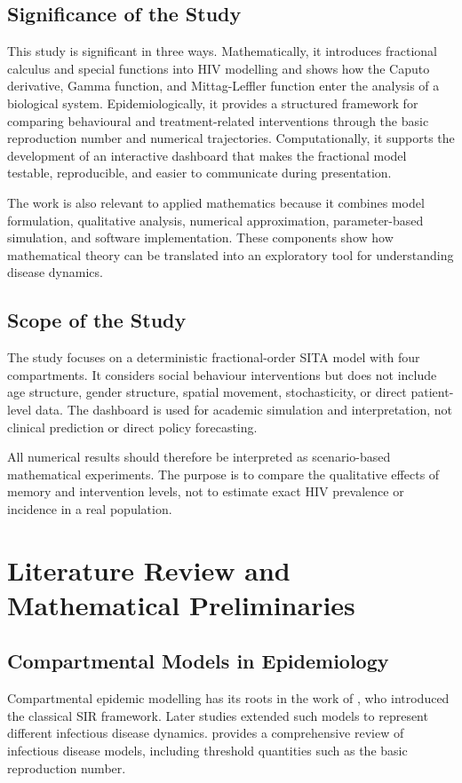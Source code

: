 \documentclass[12pt,a4paper,oneside]{report}
\begin{document}
\newpage

\section{Significance of the Study}
This study is significant in three ways. Mathematically, it introduces fractional calculus and special functions into HIV modelling and shows how the Caputo derivative, Gamma function, and Mittag-Leffler function enter the analysis of a biological system. Epidemiologically, it provides a structured framework for comparing behavioural and treatment-related interventions through the basic reproduction number and numerical trajectories. Computationally, it supports the development of an interactive dashboard that makes the fractional model testable, reproducible, and easier to communicate during presentation.

The work is also relevant to applied mathematics because it combines model formulation, qualitative analysis, numerical approximation, parameter-based simulation, and software implementation. These components show how mathematical theory can be translated into an exploratory tool for understanding disease dynamics.

\section{Scope of the Study}
The study focuses on a deterministic fractional-order SITA model with four compartments. It considers social behaviour interventions but does not include age structure, gender structure, spatial movement, stochasticity, or direct patient-level data. The dashboard is used for academic simulation and interpretation, not clinical prediction or direct policy forecasting.

All numerical results should therefore be interpreted as scenario-based mathematical experiments. The purpose is to compare the qualitative effects of memory and intervention levels, not to estimate exact HIV prevalence or incidence in a real population.

\chapter{Literature Review and Mathematical Preliminaries}

\section{Compartmental Models in Epidemiology}
Compartmental epidemic modelling has its roots in the work of \citet{Kermack1927}, who introduced the classical SIR framework. Later studies extended such models to represent different infectious disease dynamics. \citet{Hethcote2000} provides a comprehensive review of infectious disease models, including threshold quantities such as the basic reproduction number.
\end{document}
